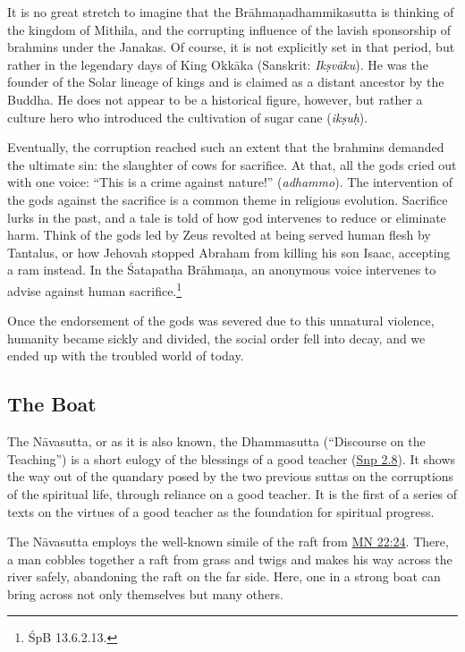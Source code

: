 \documentclass[12pt,openany]{book}%
\begin{document}
It is no great stretch to imagine that the \textsanskrit{Brāhmaṇadhammikasutta} is thinking of the kingdom of Mithila, and the corrupting influence of the lavish sponsorship of brahmins under the Janakas. Of course, it is not explicitly set in that period, but rather in the legendary days of King \textsanskrit{Okkāka} (Sanskrit: \textit{\textsanskrit{Ikṣvāku}}). He was the founder of the Solar lineage of kings and is claimed as a distant ancestor by the Buddha. He does not appear to be a historical figure, however, but rather a culture hero who introduced the cultivation of sugar cane (\textit{\textsanskrit{ikṣuḥ}}).

Eventually, the corruption reached such an extent that the brahmins demanded the ultimate sin: the slaughter of cows for sacrifice. At that, all the gods cried out with one voice: “This is a crime against nature!” (\textit{adhammo}). The intervention of the gods against the sacrifice is a common theme in religious evolution. Sacrifice lurks in the past, and a tale is told of how god intervenes to reduce or eliminate harm. Think of the gods led by Zeus revolted at being served human flesh by Tantalus, or how Jehovah stopped Abraham from killing his son Isaac, accepting a ram instead. In the Śatapatha \textsanskrit{Brāhmaṇa}, an anonymous voice intervenes to advise against human sacrifice.\footnote{ŚpB 13.6.2.13. }

Once the endorsement of the gods was severed due to this unnatural violence, humanity became sickly and divided, the social order fell into decay, and we ended up with the troubled world of today.

\subsection*{The Boat}

The \textsanskrit{Nāvasutta}, or as it is also known, the Dhammasutta (“Discourse on the Teaching”) is a short eulogy of the blessings of a good teacher (\href{https://suttacentral.net/snp2.8/en/sujato}{Snp 2.8}). It shows the way out of the quandary posed by the two previous suttas on the corruptions of the spiritual life, through reliance on a good teacher. It is the first of a series of texts on the virtues of a good teacher as the foundation for spiritual progress.

The \textsanskrit{Nāvasutta} employs the well-known simile of the raft from \href{https://suttacentral.net/mn22/en/sujato\#24}{MN 22:24}. There, a man cobbles together a raft from grass and twigs and makes his way across the river safely, abandoning the raft on the far side. Here, one in a strong boat can bring across not only themselves but many others.
\end{document}
